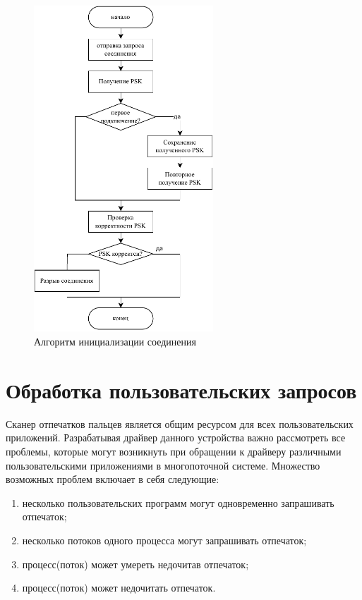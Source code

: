 \begin{figure}[h!]
    \centering
    \includegraphics[width=0.6\textwidth]{img/init}
    \caption{Алгоритм инициализации соединения}
    \label{fig:init}
\end{figure}

\clearpage

\section{Обработка пользовательских запросов}

Сканер отпечатков пальцев является общим ресурсом для всех пользовательских приложений. Разрабатывая драйвер данного устройства важно рассмотреть все проблемы, которые могут возникнуть при обращении к драйверу различными пользовательскими приложениями в многопоточной системе.
Множество возможных проблем включает в себя следующие: 

\begin{enumerate}
    \item несколько пользовательских программ могут одновременно запрашивать отпечаток;
    \item несколько потоков одного процесса могут запрашивать отпечаток;
    \item процесс(поток) может умереть недочитав отпечаток;
    \item процесс(поток) может недочитать отпечаток.
\end{enumerate}

